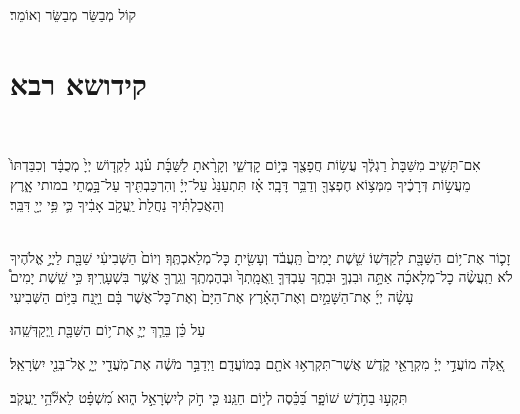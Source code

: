 \documentclass[twoside, openany, parskip=half, 11pt]{book}
\begin{document}
\begin{large}
	קוֹל מְבַשֵּׂר מְבַשֵּׂר וְאוֹמֵר׃
	
\end{large}

\hoshia

\label{YTmusaftitkabal}


\siyyumshabbatYT

\mournerskaddish

\adonolam

\chapter[קידושא רבא ליו״ט]{ קידושא רבא }

\\\begin{footnotesize}
אִם־תָּשִׁ֤יב מִשַּׁבָּת֙ רַגְלֶ֔ךָ עֲשׂ֥וֹת חֲפָצֶ֖ךָ בְּי֣וֹם קׇדְשִׁ֑י וְקָרָ֨אתָ לַשַּׁבָּ֜ת עֹ֗נֶג לִקְד֤וֹשׁ יְיָ֙ מְכֻבָּ֔ד וְכִבַּדְתּוֹ֙ מֵעֲשׂ֣וֹת דְּרָכֶ֔יךָ מִמְּצ֥וֹא חֶפְצְךָ֖ וְדַבֵּ֥ר דָּבָֽר׃ אָ֗ז תִּתְעַנַּג֙ עַל־יְיָ֔ וְהִרְכַּבְתִּ֖יךָ עַל־בָּ֣מֳתֵי במותי אָ֑רֶץ וְהַאֲכַלְתִּ֗יךָ נַחֲלַת֙ יַֽעֲקֹ֣ב אָבִ֔יךָ כִּ֛י פִּ֥י יְיָ֖ דִּבֵּֽר׃

\veshameru\\
זָכ֛וֹר אֶת־י֥וֹם הַשַּׁבָּ֖ת לְקַדְּשֽׁוֹ׃ שֵׁ֤שֶׁת יָמִים֙ תַּֽעֲבֹ֔ד וְעָשִׂ֖יתָ כׇּל־מְלַאכְתֶּֽךָ׃ וְיוֹם֙ הַשְּׁבִיעִ֔י שַׁבָּ֖ת לַיֽיֳ֣ אֱלֹהֶיךָ לֹא תַֽעֲשֶׂ֨ה כׇל־מְלָאכָ֜ה אַתָּ֣ה וּבִנְךָ֣ וּבִתֶֽךָ עַבְדְּךָ֤ וַֽאֲמָֽתְךָ֙ וּבְהֶמְתֶֽךָ וְגֵֽרְךָ֖ אֲשֶׁ֥ר בִּשְׁעָרֶֽיךָ׃ כִּ֣י שֵֽׁשֶׁת יָמִים֩ עָשָׂ֨ה יְיָ֜ אֶת־הַשָּׁמַ֣יִם וְאֶת־הָאָ֗רֶץ אֶת־הַיָּם֙ וְאֶת־כׇּל־אֲשֶׁר בָּ֔ם וַיָּ֖נַח בַּיּ֣וֹם הַשְּׁבִיעִי\\ \end{footnotesize} עַל כֵּ֗ן בֵּרַ֧ךְ יְיָ֛ אֶת־י֥וֹם הַשַּׁבָּ֖ת וַֽיְקַדְּשֵֽׁהוּ׃

\sepline

  אֵ֚לֶּה מוֹעֲדֵ֣י יְיָ֔ מִקְרָאֵ֖י קֹ֑דֶשׁ אֲשֶׁר־תִּקְרְא֥וּ אֹתָ֖ם בְּמוֹעֲדָֽם׃ וַיְדַבֵּ֣ר מֹשֶׁ֔ה אֶת־מֹֽעֲדֵ֖י יְיָ֑ אֶל־בְּנֵ֖י יִשְׂרָאֵֽל׃

\sepline

  תִּקְע֣וּ בַחֹ֣דֶשׁ שׁוֹפָ֑ר בַּ֝כֵּ֗סֶה לְי֣וֹם חַגֵּֽנוּ׃ כִּ֤י חֹ֣ק לְיִשְׂרָאֵ֣ל ה֑וּא מִ֝שְׁפָּ֗ט לֵאלֹ֘הֵ֥י יַֽעֲקֹֽב׃
\end{document}
